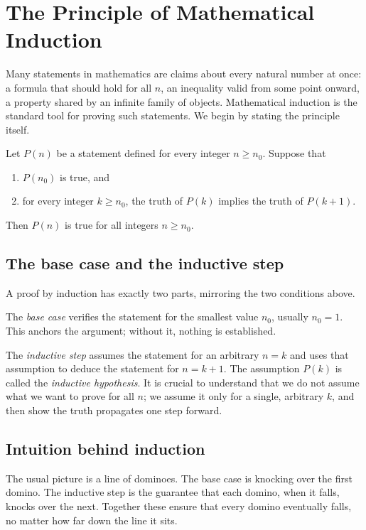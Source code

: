 \section{The Principle of Mathematical Induction}

Many statements in mathematics are claims about every natural number at once: a formula that should hold for all $n$, an inequality valid from some point onward, a property shared by an infinite family of objects. Mathematical induction is the standard tool for proving such statements. We begin by stating the principle itself.

\begin{definition}
Let $P(n)$ be a statement defined for every integer $n \geq n_0$. Suppose that
\begin{enumerate}
    \item $P(n_0)$ is true, and
    \item for every integer $k \geq n_0$, the truth of $P(k)$ implies the truth of $P(k+1)$.
\end{enumerate}
Then $P(n)$ is true for all integers $n \geq n_0$.
\end{definition}

\subsection{The base case and the inductive step}

A proof by induction has exactly two parts, mirroring the two conditions above.

The \emph{base case} verifies the statement for the smallest value $n_0$, usually $n_0 = 1$. This anchors the argument; without it, nothing is established.

The \emph{inductive step} assumes the statement for an arbitrary $n = k$ and uses that assumption to deduce the statement for $n = k+1$. The assumption $P(k)$ is called the \emph{inductive hypothesis}. It is crucial to understand that we do not assume what we want to prove for all $n$; we assume it only for a single, arbitrary $k$, and then show the truth propagates one step forward.

\subsection{Intuition behind induction}

The usual picture is a line of dominoes. The base case is knocking over the first domino. The inductive step is the guarantee that each domino, when it falls, knocks over the next. Together these ensure that every domino eventually falls, no matter how far down the line it sits.

